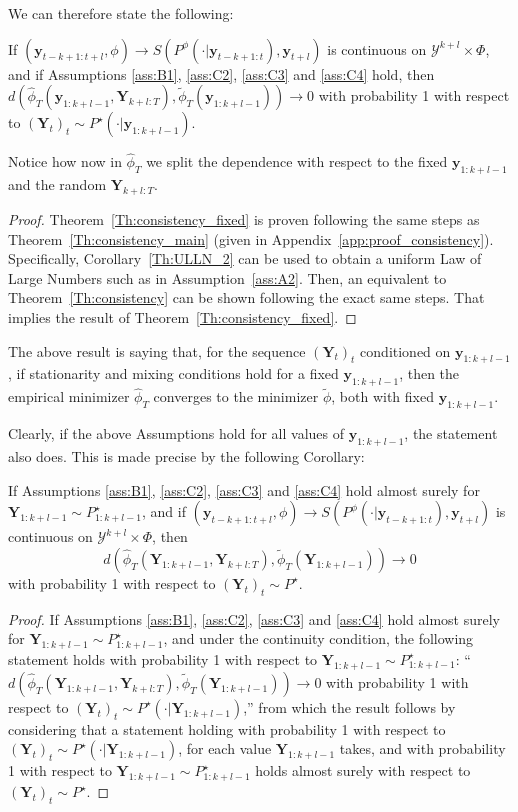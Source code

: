 \documentclass[twoside,11pt]{article}
\newcommand{\ddobs}{\mathbf{y}}
\newcommand{\Ddobs}{\mathbf{Y}}
\newcommand{\ddobsupkplusl}{\mathbf{y}_{1:k+l-1}}
\newcommand{\Ddobsupkplusl}{\mathbf{Y}_{1:k+l-1}}
\newcommand{\DdobsupTfromk}{\mathbf{Y}_{k+l:T}}
\begin{document}
	We can therefore state the following: 
	\begin{theorem}\label{Th:consistency_fixed}
		If $ (\ddobs_{t-k+1:t+l}, \phi) \to S(P^\phi(\cdot|\ddobs_{t-k+1:t}), \ddobs_{t+l}) $ is continuous on $ \mathcal{Y}^{k+l} \times \Phi $, and if Assumptions  \ref{ass:B1}, \ref{ass:C2}, \ref{ass:C3} and \ref{ass:C4} hold, then $ d(\hat \phi_T(\ddobsupkplusl, \DdobsupTfromk), \tilde\phi_T(\ddobsupkplusl)) \to 0 $ with probability 1  with respect to $(\Ddobs_t)_t\sim P^\star(\cdot|\ddobsupkplusl) $.
	\end{theorem}
	Notice how now in $ \hat \phi_T $ we split the dependence with respect to the fixed $ \ddobsupkplusl $ and the random $ \DdobsupTfromk $. 
	\begin{proof}
		Theorem~\ref{Th:consistency_fixed} is proven following the same steps as Theorem~\ref{Th:consistency_main} (given in Appendix~\ref{app:proof_consistency}). Specifically, Corollary~\ref{Th:ULLN_2} can be used to obtain a uniform Law of Large Numbers such as in Assumption~\ref{ass:A2}. Then, an equivalent to Theorem~\ref{Th:consistency} can be shown following the exact same steps. That implies the result of Theorem~\ref{Th:consistency_fixed}.
	\end{proof}
	
	
	The above result is saying that, for the sequence $ (\Ddobs_t)_t $ conditioned on $ \ddobsupkplusl $, if stationarity and mixing conditions hold for a fixed $ \ddobsupkplusl  $, then the empirical minimizer $ \hat \phi_T $ converges to the minimizer $ \tilde \phi $, both with fixed $ \ddobsupkplusl  $. 
	
	Clearly, if the above Assumptions hold for all values of $ \ddobsupkplusl  $, the statement also does. This is made precise by the following Corollary: 
	\begin{corollary}\label{Th:consistency_fixed_corollary}
		If Assumptions  \ref{ass:B1}, \ref{ass:C2}, \ref{ass:C3} and \ref{ass:C4} hold almost surely for $ \Ddobsupkplusl \sim P^\star_{1:k+l-1}$, and if $ (\ddobs_{t-k+1:t+l}, \phi) \to S(P^\phi(\cdot|\ddobs_{t-k+1:t}), \ddobs_{t+l}) $ is continuous on $ \mathcal{Y}^{k+l} \times \Phi $, then $$ d(\hat \phi_T(\Ddobsupkplusl, \DdobsupTfromk), \tilde\phi_T(\Ddobsupkplusl)) \to 0 $$ with probability 1  with respect to $(\Ddobs_t)_t\sim P^\star$.
	\end{corollary}
	\begin{proof}
		If Assumptions \ref{ass:B1}, \ref{ass:C2}, \ref{ass:C3} and \ref{ass:C4} hold almost surely for $ \Ddobsupkplusl \sim P^\star_{1:k+l-1}$, and under the continuity condition, the following statement holds with probability 1 with respect to $ \Ddobsupkplusl \sim P^\star_{1:k+l-1}$:
		``$ d(\hat \phi_T(\Ddobsupkplusl, \DdobsupTfromk), \tilde\phi_T(\Ddobsupkplusl)) \to 0 $ with probability 1  with respect to $(\Ddobs_t)_t\sim P^\star(\cdot|\Ddobsupkplusl) $,''
		from which the result follows by considering that a statement holding with probability 1 with respect to $(\Ddobs_t)_t\sim P^\star(\cdot|\Ddobsupkplusl) $, for each value $ \Ddobsupkplusl $ takes, and with probability 1 with respect to $ \Ddobsupkplusl \sim P^\star_{1:k+l-1} $ holds almost surely with respect to $(\Ddobs_t)_t\sim P^\star$.
	\end{proof}
	
\end{document}
